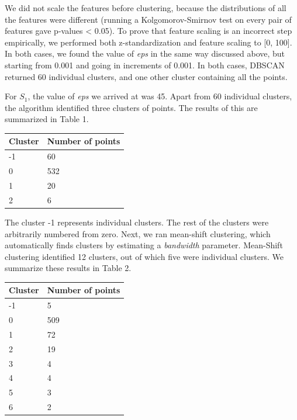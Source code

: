 \documentclass[smallextended]{svjour3}
\begin{document}
	We did not scale the features before clustering, because the distributions of all the features were different (running a Kolgomorov-Smirnov test on every pair of features gave p-values < 0.05). To prove that feature scaling is an incorrect step empirically, we performed both z-standardization and feature scaling to [0, 100]. In both cases, we found the value of \textit{eps} in the same way discussed above, but starting from 0.001 and going in increments of 0.001. In both cases, DBSCAN returned 60 individual clusters, and one other cluster containing all the points.
	
	For $S_1$, the value of \textit{eps} we arrived at was 45. Apart from 60 individual clusters, the algorithm identified three clusters of points. The results of this are summarized in Table 1. \\
	
	\begingroup
	\endgroup
	\begin{tabular}{ll}
		\hline 
		\textbf{Cluster} & \textbf{Number of points} \\ 
		\hline 
		-1 & 60 \\ 
		\hline 
		0 & 532 \\ 
		\hline 
		1 & 20 \\ 
		\hline 
		2 & 6 \\ 
		\hline 
	\end{tabular}
	\hfill\break
	
	The cluster -1 represents individual clusters. The rest of the clusters were arbitrarily numbered from zero. Next, we ran mean-shift clustering, which automatically finds clusters by estimating a \textit{bandwidth} parameter. Mean-Shift clustering identified 12 clusters, out of which five were individual clusters. We summarize these results in Table 2.\\
	
	\begingroup
	\endgroup
	\begin{tabular}{ll}
		\hline 
		\textbf{Cluster} & \textbf{Number of points} \\ 
		\hline 
		-1 & 5 \\ 
		\hline 
		0 & 509 \\ 
		\hline 
		1 & 72 \\ 
		\hline 
		2 & 19 \\ 
		\hline 
		3 & 4 \\ 
		\hline 
		4 & 4 \\ 
		\hline 
		5 & 3 \\ 
		\hline 
		6 & 2 \\ 
		\hline 
	\end{tabular}
	
\end{document}
